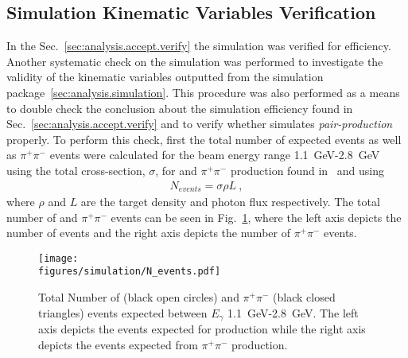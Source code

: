 \subsection{Simulation Kinematic Variables Verification}\label{sec:analysis.simsmear.verify}

In the Sec.~\ref{sec:analysis.accept.verify} the simulation was verified for efficiency. Another systematic check on the simulation was performed to investigate the validity of the kinematic variables outputted from the simulation package~\ref{sec:analysis.simulation}. This procedure was also performed as a means to double check the conclusion about the simulation efficiency found in Sec.~\ref{sec:analysis.accept.verify} and to verify whether  simulates \emph{pair-production} properly. To perform this check, first the total number of expected \pizT events as well as $\pi^+\pi^-$ events were calculated for the beam energy range 1.1~GeV-2.8~GeV using the total cross-section, $\sigma$, for \pizT and $\pi^+\pi^-$ production found in~\cite{durham} and using
\begin{align}
N_{events} = \sigma \rho L \ ,
\end{align}
where $\rho$ and $L$ are the target density and photon flux respectively. The total number of \pizT and $\pi^+\pi^-$ events can be seen in Fig.~\ref{fig:simsmear.Ntot}, where the left axis depicts the number of \pizT events and the right axis depicts the number of $\pi^+\pi^-$ events.
\begin{figure}[h!]\begin{center}
		\texttt{[image: \\figures/simulation/N\_events.pdf]}
		\caption[Total Number of \pizT and $\pi^+\pi^-$ Events Expected Between $E_{\gamma}$ 1.1~GeV-2.8~GeV ]{\label{fig:simsmear.Ntot}Total Number of \pizT (black open circles) and $\pi^+\pi^-$ (black closed triangles) events expected between $E_{\gamma}$ 1.1~GeV-2.8~GeV. The left axis depicts the events expected for \pizT production while the right axis depicts the events expected from $\pi^+\pi^-$ production. }
	\end{center}\end{figure} 
	
